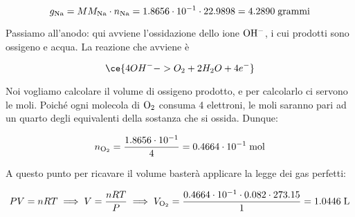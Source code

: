 \begin{soluzione}
\begin{equation*}
    g_{\rm Na}=MM_{\rm Na} \cdot n_{\rm Na}
    =1.8656 \cdot 10^{-1} \cdot 22.9898
    =4.2890 \; \rm grammi
\end{equation*}

Passiamo all'anodo: qui avviene l'ossidazione dello ione $\rm OH^-$, i cui prodotti sono ossigeno e acqua. La reazione che avviene è

\begin{equation*}
    \ce{4OH^- -> O_2 + 2H_2O + 4e^-}
\end{equation*}

Noi vogliamo calcolare il volume di ossigeno prodotto, e per calcolarlo ci servono le moli. Poiché ogni molecola di $\rm O_2$ consuma 4 elettroni, le moli saranno pari ad un quarto degli equivalenti della sostanza che si ossida. Dunque:

\begin{equation*}
    n_{\rm O_2}
    =\frac{1.8656 \cdot 10^{-1}}{4}
    =0.4664 \cdot 10^{-1} \; \rm mol
\end{equation*}

A questo punto per ricavare il volume basterà applicare la legge dei gas perfetti:

\begin{equation*}
    PV=nRT
    \implies
    V=\frac{nRT}{P}
    \implies
    V_{\rm O_2}=\frac{0.4664 \cdot 10^{-1} \cdot 0.082 \cdot 273.15}{1}
    =1.0446 \; \rm L
\end{equation*}
\end{soluzione}